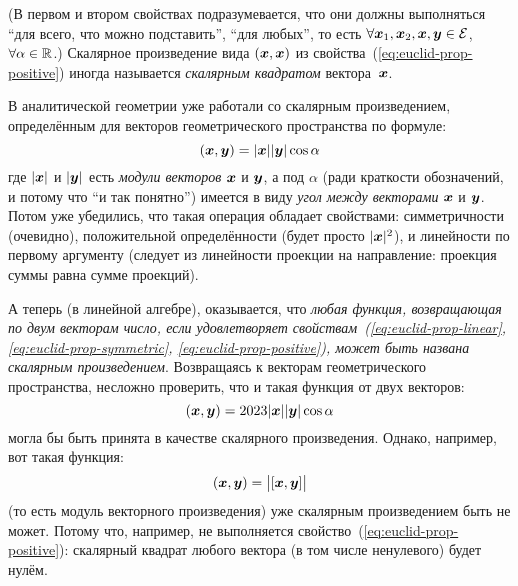 \documentclass[a4paper,12pt]{article}
\begin{document}
  (В первом и втором свойствах подразумевается, что они должны выполняться ``для всего, что можно подставить'', ``для любых'', то есть $\forall \bds x_1, \bds x_2, \bds x, \bds y \hm\in \mathcal E$, $\forall \alpha \hm\in \RR$.)
  Скалярное произведение вида $(\boldsymbol x, \boldsymbol x)$ из свойства~(\ref{eq:euclid-prop-positive}) иногда называется \emph{скалярным квадратом} вектора~$\boldsymbol x$.
  
  \begin{example}
    В аналитической геометрии уже работали со скалярным произведением, определённым для векторов геометрического пространства по формуле:
    \[
      (\boldsymbol x, \boldsymbol y) = |\boldsymbol x| |\boldsymbol y| \cos \alpha
    \]
    где $|\boldsymbol x|$ и $|\boldsymbol y|$ есть \emph{модули векторов} $\boldsymbol x$ и $\boldsymbol y$, а под $\alpha$ (ради краткости обозначений, и потому что ``и так понятно'') имеется в виду \emph{угол между векторами} $\boldsymbol x$ и $\boldsymbol y$.
    Потом уже убедились, что такая операция обладает свойствами: симметричности (очевидно), положительной определённости (будет просто $|\boldsymbol x|^2$), и линейности по первому аргументу (следует из линейности проекции на направление: проекция суммы равна сумме проекций).
    
    А теперь (в линейной алгебре), оказывается, что \emph{любая функция, возвращающая по двум векторам число, если удовлетворяет свойствам~(\ref{eq:euclid-prop-linear}, \ref{eq:euclid-prop-symmetric}, \ref{eq:euclid-prop-positive}), может быть названа скалярным произведением}.
    Возвращаясь к векторам геометрического пространства, несложно проверить, что и такая функция от двух векторов:
    \[
      (\boldsymbol x, \boldsymbol y) = 2023 |\boldsymbol x| |\boldsymbol y| \cos\alpha
    \]
    могла бы быть принята в качестве скалярного произведения.
    Однако, например, вот такая функция:
    \[
      (\boldsymbol x, \boldsymbol y) = \bigl|[\boldsymbol x, \boldsymbol y]\bigr|
    \]
    (то есть модуль векторного произведения) уже скалярным произведением быть не может.
    Потому что, например, не выполняется свойство~(\ref{eq:euclid-prop-positive}): скалярный квадрат любого вектора (в том числе ненулевого) будет нулём.
  \end{example}
  
\end{document}
